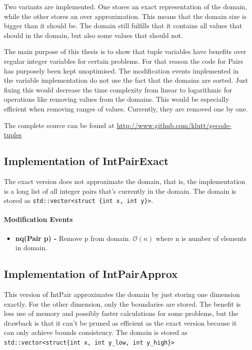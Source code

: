 \documentclass[a4paper,11pt]{article}
\begin{document}
Two variants are implemented. One stores an exact representation of the domain, while the other stores an over approximation. This means that the domain size is bigger than it should be. The domain still fulfills that it contains all values that should in the domain, but also some values that should not.

The main purpose of this thesis is to show that tuple variables have benefits over regular integer variables for certain problems. For that reason the code for Pairs has purposely been kept unoptimised. The modification events implemented in the variable implementation do not use the fact that the domains are sorted. Just fixing this would decrease the time complexity from linear to logarithmic for operations like removing values from the domains. This would be especially efficient when removing ranges of values. Currently, they are removed one by one.

The complete source can be found at \url{http://www.github.com/klutt/gecode-tuples}

\subsection{Implementation of IntPairExact}
The exact version does not approximate the domain, that is, the implementation is a long list of all integer pairs that's currently in the domain. The domain is stored as \texttt{std::vector<struct \{int x, int y\}>}. 

\paragraph{Modification Events}
\begin{itemize}
\item {\textbf{nq(Pair p) - }} Remove p from domain. $\mathcal{O}(n)$ where n is number of elements in domain.
\end{itemize}
\subsection{Implementation of IntPairApprox}
This version of IntPair approximates the domain by just storing one dimension exactly. For the other dimension, only the boundaries are stored. The benefit is less use of memory and possibly faster calculations for some problems, but the drawback is that it can't be pruned as efficient as the exact version because it can only achieve bounds consistency. The domain is stored as \texttt{std::vector<struct\{int x, int y\_low, int y\_high\}>}
\end{document}
